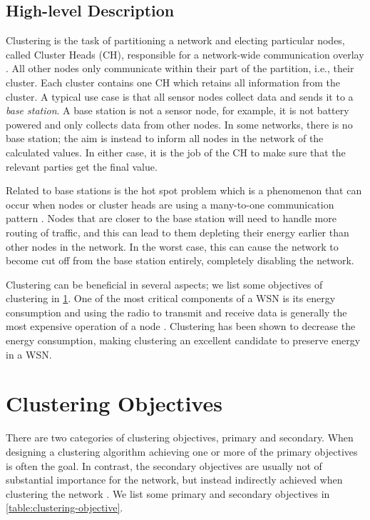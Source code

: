 \subsection{High-level Description}
Clustering is the task of partitioning a network and electing particular nodes, called Cluster Heads (CH), responsible for a network-wide communication overlay \cite{Younis2006-clustering-survey}. All other nodes only communicate within their part of the partition, i.e., their cluster. Each cluster contains one CH which retains all information from the cluster. A typical use case is that all sensor nodes collect data and sends it to a \textit{base station}. A base station is not a sensor node, for example, it is not battery powered and only collects data from other nodes. In some networks, there is no base station; the aim is instead to inform all nodes in the network of the calculated values. In either case, it is the job of the CH to make sure that the relevant parties get the final value.

Related to base stations is the hot spot problem which is a phenomenon that can occur when nodes or cluster heads are using a many-to-one communication pattern \cite{Perillo2005-hot-spot-survey}. Nodes that are closer to the base station will need to handle more routing of traffic, and this can lead to them depleting their energy earlier than other nodes in the network. In the worst case, this can cause the network to become cut off from the base station entirely, completely disabling the network.

Clustering can be beneficial in several aspects; we list some objectives of clustering in \cref{sec:clustering-objectives}. One of the most critical components of a WSN is its energy consumption and using the radio to transmit and receive data is generally the most expensive operation of a node \cite{Anastasi2009-wsn-energy-consumption}. Clustering has been shown to decrease the energy consumption, making clustering an excellent candidate to preserve energy in a WSN.



\section{Clustering Objectives}
\label{sec:clustering-objectives}
There are two categories of clustering objectives, primary and secondary. When designing a clustering algorithm achieving one or more of the primary objectives is often the goal. In contrast, the secondary objectives are usually not of substantial importance for the network, but instead indirectly achieved when clustering the network \cite{Afsar2014-clustering-survey}. We list some primary and secondary objectives in \cref{table:clustering-objective}.

